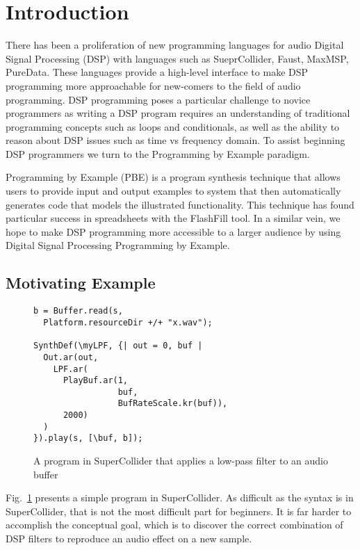 
\section{Introduction}

There has been a proliferation of new programming languages for audio Digital Signal Processing (DSP) with languages such as SueprCollider, Faust, MaxMSP, PureData.
These languages provide a high-level interface to make DSP programming more approachable for new-comers to the field of audio programming.
DSP programming poses a particular challenge to novice programmers as writing a DSP program requires an understanding of traditional programming concepts such as loops and conditionals, as well as the ability to reason about DSP issues such as time vs frequency domain.
To assist beginning DSP programmers we turn to the Programming by Example paradigm.

Programming by Example (PBE) is a program synthesis technique that allows users to provide input and output examples to system that then automatically generates code that models the illustrated functionality.
This technique has found particular success in spreadsheets with the FlashFill tool.
In a similar vein, we hope to make DSP programming more accessible to a larger audience by using Digital Signal Processing Programming by Example.


\subsection{Motivating Example}


\begin{figure}
\begin{lstlisting}
b = Buffer.read(s, 
  Platform.resourceDir +/+ "x.wav");

SynthDef(\myLPF, {| out = 0, buf |
  Out.ar(out,
    LPF.ar(
      PlayBuf.ar(1, 
                 buf, 
                 BufRateScale.kr(buf)),
      2000)
  )
}).play(s, [\buf, b]);
\end{lstlisting}
\caption{A program in SuperCollider that applies a low-pass filter to an audio buffer}
\label{fig:sc_code}
\end{figure}

Fig.~\ref{fig:sc_code} presents a simple program in SuperCollider.
As difficult as the syntax is in SuperCollider, that is not the most difficult part for beginners.
It is far harder to accomplish the conceptual goal, which is to discover the correct combination of DSP filters to reproduce an audio effect on a new sample.


